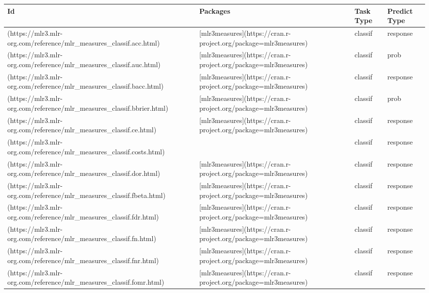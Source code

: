 \documentclass[
]{scrbook}
\begin{document}
\begin{tabular}{l|l|l|l}
\hline
Id & Packages & Task Type & Predict Type\\
\hline
[`classif.acc`](https://mlr3.mlr-org.com/reference/mlr\_measures\_classif.acc.html) & [mlr3measures](https://cran.r-project.org/package=mlr3measures) & classif & response\\
\hline
[`classif.auc`](https://mlr3.mlr-org.com/reference/mlr\_measures\_classif.auc.html) & [mlr3measures](https://cran.r-project.org/package=mlr3measures) & classif & prob\\
\hline
[`classif.bacc`](https://mlr3.mlr-org.com/reference/mlr\_measures\_classif.bacc.html) & [mlr3measures](https://cran.r-project.org/package=mlr3measures) & classif & response\\
\hline
[`classif.bbrier`](https://mlr3.mlr-org.com/reference/mlr\_measures\_classif.bbrier.html) & [mlr3measures](https://cran.r-project.org/package=mlr3measures) & classif & prob\\
\hline
[`classif.ce`](https://mlr3.mlr-org.com/reference/mlr\_measures\_classif.ce.html) & [mlr3measures](https://cran.r-project.org/package=mlr3measures) & classif & response\\
\hline
[`classif.costs`](https://mlr3.mlr-org.com/reference/mlr\_measures\_classif.costs.html) &  & classif & response\\
\hline
[`classif.dor`](https://mlr3.mlr-org.com/reference/mlr\_measures\_classif.dor.html) & [mlr3measures](https://cran.r-project.org/package=mlr3measures) & classif & response\\
\hline
[`classif.fbeta`](https://mlr3.mlr-org.com/reference/mlr\_measures\_classif.fbeta.html) & [mlr3measures](https://cran.r-project.org/package=mlr3measures) & classif & response\\
\hline
[`classif.fdr`](https://mlr3.mlr-org.com/reference/mlr\_measures\_classif.fdr.html) & [mlr3measures](https://cran.r-project.org/package=mlr3measures) & classif & response\\
\hline
[`classif.fn`](https://mlr3.mlr-org.com/reference/mlr\_measures\_classif.fn.html) & [mlr3measures](https://cran.r-project.org/package=mlr3measures) & classif & response\\
\hline
[`classif.fnr`](https://mlr3.mlr-org.com/reference/mlr\_measures\_classif.fnr.html) & [mlr3measures](https://cran.r-project.org/package=mlr3measures) & classif & response\\
\hline
[`classif.fomr`](https://mlr3.mlr-org.com/reference/mlr\_measures\_classif.fomr.html) & [mlr3measures](https://cran.r-project.org/package=mlr3measures) & classif & response\\

\end{tabular}
\end{document}
